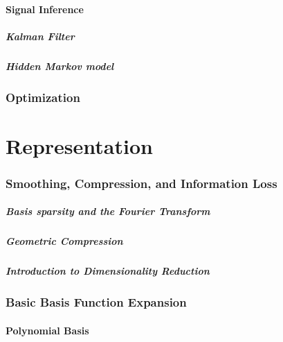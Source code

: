\documentclass[10pt]{article}
\begin{document}
\subsection{Signal Inference}

\subsubsection{Kalman Filter}

\subsubsection{Hidden Markov model}

\section{Optimization}




\newpage

\part{Representation}

\section{Smoothing, Compression, and Information Loss}

\subsubsection{Basis sparsity and the Fourier Transform}

\subsubsection{Geometric Compression}

\subsubsection{Introduction to Dimensionality Reduction}

\newpage

\section{Basic Basis Function Expansion}

\subsection{Polynomial Basis}
\end{document}
